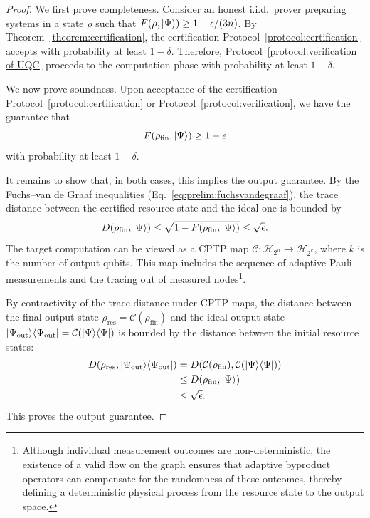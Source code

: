 \documentclass[a4paper,twocolumn,11pt,unpublished]{quantumarticle}
\newcommand{\ketbra}[1]{\ket{#1}\!\bra{#1}}
\begin{document}
\begin{proof}
    We first prove completeness. Consider an honest i.i.d.\ prover preparing systems in a state $\rho$ such that $F(\rho,\ket{\Psi})\geq 1-\epsilon/(3n)$. By Theorem~\ref{theorem:certification}, the certification Protocol~\ref{protocol:certification} accepts with probability at least $1-\delta$. Therefore, Protocol~\ref{protocol:verification of UQC} proceeds to the computation phase with probability at least $1-\delta$.

    We now prove soundness. Upon acceptance of the certification Protocol~\ref{protocol:certification} or Protocol~\ref{protocol:verification}, we have the guarantee that
    \begin{equation}
        F(\rho_{\mathrm{fin}}, \ket\Psi) \geq 1-\epsilon
    \end{equation}
    with probability at least $1-\delta$.

    It remains to show that, in both cases, this implies the output guarantee. By the Fuchs--van de Graaf inequalities (Eq.~\eqref{eq:prelim:fuchsvandegraaf}), the trace distance between the certified resource state and the ideal one is bounded by
    \begin{equation}
        D(\rho_{\mathrm{fin}}, \ket\Psi) \leq \sqrt{1 - F(\rho_{\mathrm{fin}}, \ket\Psi)} \leq \sqrt{\epsilon}.
    \end{equation}
    The target computation can be viewed as a CPTP map $\mathcal{C}: \mathcal{H}_{2^n} \to \mathcal{H}_{2^k}$, where $k$ is the number of output qubits. This map includes the sequence of adaptive Pauli measurements and the tracing out of measured nodes\footnote{Although individual measurement outcomes are non-deterministic, the existence of a valid flow on the graph ensures that adaptive byproduct operators can compensate for the randomness of these outcomes, thereby defining a deterministic physical process from the resource state to the output space.}.

    By contractivity of the trace distance under CPTP maps, the distance between the final output state $\rho_{\mathrm{res}} = \mathcal{C}(\rho_{\mathrm{fin}})$ and the ideal output state $\ketbra{\Psi_{\rm out}} = \mathcal{C}(\ketbra{\Psi})$ is bounded by the distance between the initial resource states:
    \begin{align}
        D(\rho_{\mathrm{res}}, \ketbra{\Psi_{\rm out}})
        &= D(\mathcal{C}(\rho_{\mathrm{fin}}), \mathcal{C}(\ketbra{\Psi})) \nonumber \\
        &\leq D(\rho_{\mathrm{fin}}, \ket{\Psi}) \nonumber \\
        &\leq \sqrt{\epsilon}. \nonumber
    \end{align}
    This proves the output guarantee.
\end{proof}
\end{document}
